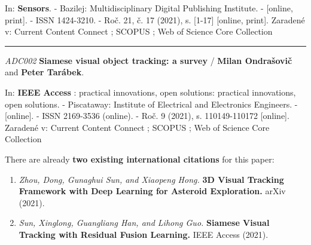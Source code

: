 \noindent In: \textbf{Sensors}. - Bazilej: Multidisciplinary Digital Publishing Institute. - [online, print]. - ISSN 1424-3210. - Roč. 21, č. 17 (2021), s. [1-17] [online, print].
Zaradené v: Current Content Connect ; SCOPUS ; Web of Science Core Collection


\noindent\rule{\textwidth}{0.4pt}

\noindent \textit{ADC002} \textbf{Siamese visual object tracking: a survey} / \textbf{Milan Ondrašovič} and \textbf{Peter Tarábek}.

\noindent In: \textbf{IEEE Access} : practical innovations, open solutions: practical innovations, open solutions. - Piscataway: Institute of Electrical and Electronics Engineers. - [online]. - ISSN 2169-3536 (online). - Roč. 9 (2021), s. 110149-110172 [online].
Zaradené v: Current Content Connect ; SCOPUS ; Web of Science Core Collection


There are already \textbf{two existing international citations} for this paper:
\begin{enumerate}
    \item \textit{Zhou, Dong, Gunaghui Sun, and Xiaopeng Hong.} \textbf{3D Visual Tracking Framework with Deep Learning for Asteroid Exploration.} arXiv (2021).
    \item \textit{Sun, Xinglong, Guangliang Han, and Lihong Guo.} \textbf{Siamese Visual Tracking with Residual Fusion Learning.} IEEE Access (2021).
\end{enumerate}
